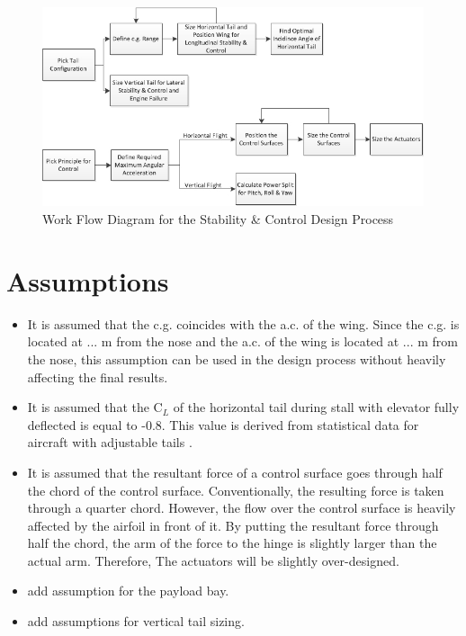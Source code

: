 
\begin{figure}[htb]
    \centering
    \includegraphics[width=\textwidth]{StabilityandControl/Figures/ApproachFlow2}
    \caption{Work Flow Diagram for the Stability \& Control Design Process}
    \label{fig:StabContFlow}
\end{figure}

\section{Assumptions}

\begin{itemize}
    \item It is assumed that the c.g. coincides with the a.c. of the wing. Since the c.g. is located at ... m from the nose and the a.c. of the wing is located at ... m from the nose, this assumption can be used in the design process without heavily affecting the final results.
    \item It is assumed that the C$_L$ of the horizontal tail during stall with elevator fully deflected is equal to -0.8. This value is derived from statistical data for aircraft with adjustable tails \cite{SEAD}.
    \item It is assumed that the resultant force of a control surface goes through half the chord of the control surface. Conventionally, the resulting force is taken through a quarter chord. However, the flow over the control surface is heavily affected by the airfoil in front of it. By putting the resultant force through half the chord, the arm of the force to the hinge is slightly larger than the actual arm. Therefore, The actuators will be slightly over-designed.
    \item add assumption for the payload bay.
    \item add assumptions for vertical tail sizing.
\end{itemize}

